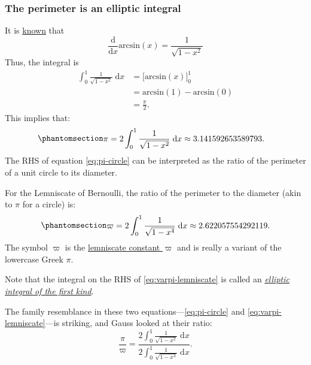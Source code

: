 \documentclass[
  a4paper,
]{article}
\begin{document}
\subsubsection{The perimeter is an elliptic
integral}\label{the-perimeter-is-an-elliptic-integral}

It is
\href{https://ocw.mit.edu/courses/18-01sc-single-variable-calculus-fall-2010/857933bc947b1ed184c79a5710fc86bc_MIT18_01SCF10_Ses15c.pdf}{known}
that \[
\frac{\mathrm{d}}{\mathrm{d}x} \mathrm{​arcsin}(x) = \frac{1}{\sqrt{1 - x^2}}
\] Thus, the integral is \[
\begin{aligned}
\int_0^1 \frac{1}{\sqrt{1 - x^2}}\;\mathrm{d}x &= \bigl[\mathrm{arcsin}(x)\bigr]_0^1\\
&= \mathrm{arcsin}(1) - \mathrm{arcsin}(0)\\
&= \frac{\pi}{2}.
\end{aligned}
\] This implies that:
\begin{equation}\phantomsection\label{eq:pi-circle}{
\begin{aligned}
\pi &= 2\int_0^1 \frac{1}{\sqrt{1 - x^2}}\;\mathrm{d}x \approx 3.141592653589793.
\end{aligned}
}\end{equation} The RHS of equation \cref{eq:pi-circle} can be
interpreted as the ratio of the perimeter of a unit circle to its
diameter.

For the Lemniscate of Bernoulli, the ratio of the perimeter to the
diameter (akin to \(\pi\) for a circle) is:
\begin{equation}\phantomsection\label{eq:varpi-lemniscate}{
\begin{aligned}
\varpi = 2\int_0^1 \frac{1}{\sqrt{1 - x^4}}\;\mathrm{d}x \approx 2.622057554292119.
\end{aligned}
}\end{equation} The symbol \(\varpi\) is the
\href{https://en.wikipedia.org/wiki/Lemniscate_constant}{lemniscate
constant \(\varpi\)} and is really a variant of the lowercase Greek
\(\pi\).

Note that the integral on the RHS of \cref{eq:varpi-lemniscate} is
called an
\href{https://mathworld.wolfram.com/EllipticIntegraloftheFirstKind.html}{\emph{elliptic
integral of the first kind}}.

The family resemblance in these two equations---\cref{eq:pi-circle} and
\cref{eq:varpi-lemniscate}---is striking, and Gauss looked at their
ratio: \[
\displaystyle\frac{\pi}{\varpi} = \frac{2\displaystyle\int_0^1 \frac{1}{\sqrt{1 - x^2}}\;\mathrm{d}x}{2\displaystyle\int_0^1 \frac{1}{\sqrt{1 - x^4}}\;\mathrm{d}x}.
\]
\end{document}

